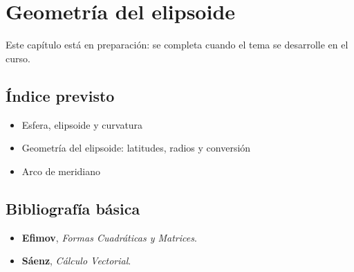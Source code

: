 \chapter{Geometría del elipsoide}\label{cap:elipsoide}

Este capítulo está en preparación: se completa cuando el tema se desarrolle en el curso.

\section*{Índice previsto}

\begin{itemize}
  \item Esfera, elipsoide y curvatura
  \item Geometría del elipsoide: latitudes, radios y conversión
  \item Arco de meridiano
\end{itemize}

\section*{Bibliografía básica}

\begin{itemize}
  \item \textbf{Efimov}, \emph{Formas Cuadráticas y Matrices}.
  \item \textbf{Sáenz}, \emph{Cálculo Vectorial}.
\end{itemize}
